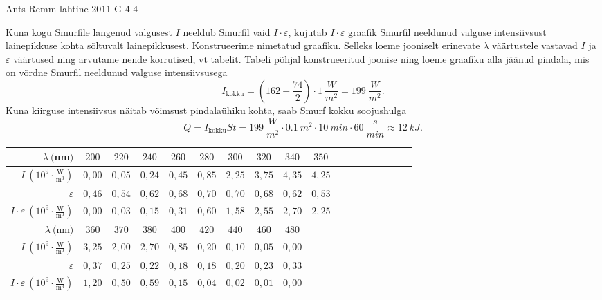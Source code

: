 \documentclass[11pt, twoside]{article}
\begin{document}
{%
{Ants Remm} %
{lahtine} %
{2011} %
{G 4} %
{4} %
{

\ifSolution
Kuna kogu Smurfile langenud valgusest $I$ neeldub Smurfil vaid $ I \cdot
\varepsilon $, kujutab $ I \cdot \varepsilon $ graafik Smurfil neeldunud valguse
intensiivsust lainepikkuse kohta sõltuvalt lainepikkusest. Konstrueerime
nimetatud graafiku. Selleks loeme jooniselt erinevate $ \lambda $ väärtustele
vastavad $ I $ ja $ \varepsilon $ väärtused ning arvutame nende korrutised, vt
tabelit. Tabeli põhjal konstrueeritud joonise ning loeme graafiku alla jäänud
pindala, mis on võrdne Smurfil neeldunud valguse intensiivsusega
\[
I_{\mathrm{kokku}} =
(162+\frac{74}{2}) \cdot \SI{1}{\frac{W}{m^2}} = \SI{199}{\frac{W}{m^2}}.
\]
Kuna kiirguse intensiivsus näitab võimsust pindalaühiku kohta, saab Smurf kokku soojushulga
\[ Q = I_{\mathrm{kokku}}St =
\SI{199}{\frac{W}{m^2}} \cdot \SI{0,1}{m^2} \cdot \SI{10}{min} \cdot
\SI{60}{\frac{s}{min}} \approx \SI{12}{kJ}.\]


\begin{tabular}{r|c|c|c|c|c|c|c|c|c|c|c|c|c|c|c|c|c|}
	\hline
	$ \lambda \ ($nm$) $&$ 200 $&$ 220 $&$ 240 $&$ 260 $&$ 280 $&$ 300 $&$ 320 $&$ 340 $&$ 350 $\\
	\hline
	$ I \ (10^9 \cdot \frac{\text{W}}{\text{m}^3}) $&$ 0,00 $&$ 0,05 $&$ 0,24 $&$ 0,45 $&$ 0,85 $&$ 2,25 $&$ 3,75 $&$ 4,35 $&$ 4,25 $\\
	\hline
	$ \varepsilon $&$ 0,46 $&$ 0,54 $&$ 0,62 $&$ 0,68 $&$ 0,70 $&$ 0,70 $&$ 0,68 $&$ 0,62 $&$ 0,53 $\\
	\hline
	$ I \cdot \varepsilon \ (10^9 \cdot \frac{\text{W}}{\text{m}^3}) $&$ 0,00 $&$ 0,03 $&$ 0,15 $&$ 0,31 $&$ 0,60 $&$ 1,58 $&$ 2,55 $&$ 2,70 $&$ 2,25 $\\
	\hline
	\hline
	$ \lambda \ ($nm$) $&$ 360 $&$ 370 $&$ 380 $&$ 400 $&$ 420 $&$ 440 $&$ 460 $&$ 480 $\\
	\hline
	$ I \ (10^9 \cdot \frac{\text{W}}{\text{m}^3}) $&$ 3,25 $&$ 2,00 $&$ 2,70 $&$ 0,85 $&$ 0,20 $&$ 0,10 $&$ 0,05 $&$ 0,00 $\\
	\hline
	$ \varepsilon $&$ 0,37 $&$ 0,25 $&$ 0,22 $&$ 0,18 $&$ 0,18 $&$ 0,20 $&$ 0,23 $&$ 0,33 $\\
	\hline
	$ I \cdot \varepsilon \ (10^9 \cdot \frac{\text{W}}{\text{m}^3}) $&$ 1,20 $&$ 0,50 $&$ 0,59 $&$ 0,15 $&$ 0,04 $&$ 0,02 $&$ 0,01 $&$ 0,00 $\\ 	
\end{tabular}

}}
\end{document}
